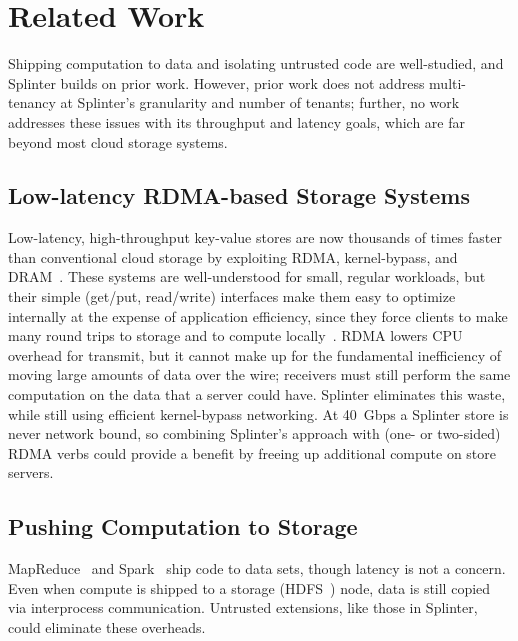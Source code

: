 \section{Related Work}
\label{sec:related}

Shipping computation to data and isolating untrusted code are well-studied, and
Splinter builds on prior work.
However, prior work does not address multi-tenancy at Splinter's granularity and
number of tenants; further, no work addresses
these issues with its throughput and latency goals, which are far
beyond most cloud storage systems.

\subsection{Low-latency RDMA-based Storage Systems}
%
Low-latency, high-throughput key-value stores are now thousands of times faster
  than conventional cloud storage by exploiting RDMA, kernel-bypass, and
  DRAM~\cite{farm-2014,farm-txns,herd,billions,mica,ramcloud}.
These systems are well-understood for small, regular workloads, but their
  simple (get/put, read/write) interfaces make them easy to optimize internally
  at the expense of application efficiency, since they
  force clients to make many round trips to storage and to compute locally~\cite{deb-farm}.
%
RDMA lowers CPU overhead for transmit, but it cannot make up for the
  fundamental inefficiency of moving large amounts of data over the wire;
  receivers must still perform the same computation
  on the data that a server could have.
Splinter eliminates this waste, while still using efficient kernel-bypass networking.
%
At 40~Gbps a Splinter store is never network bound, so combining Splinter's
  approach with (one- or two-sided) RDMA verbs could provide a benefit by freeing up
  additional compute on store servers.

\subsection{Pushing Computation to Storage}

MapReduce~\cite{mapreduce} and Spark~\cite{spark} ship code to data
sets, though latency is not a concern.  Even when compute is shipped to a storage
(HDFS~\cite{hdfs}) node, data is still copied via interprocess
communication.  Untrusted extensions, like those in Splinter, could
eliminate these overheads.


